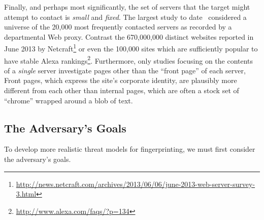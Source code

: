 Finally, and perhaps most significantly, the set of servers that the
target might attempt to contact is \emph{small} and \emph{fixed}.  The
largest study to date~ considered a universe of the
20,000 most frequently contacted servers as recorded by a departmental
Web proxy.  Contrast the 670,000,000 distinct websites reported in
June 2013 by
Netcraft\footnote{\url{http://news.netcraft.com/archives/2013/06/06/june-2013-web-server-survey-3.html}}
or even the 100,000 sites which are sufficiently popular to have
stable Alexa rankings\footnote{\url{http://www.alexa.com/faqs/?p=134}}.
Furthermore, only studies focusing on the contents of a \emph{single}
server investigate pages other than the “front page” of each server,
Front pages, which express the site's corporate identity, are
plausibly more different from each other than internal pages, which
are often a stock set of “chrome” wrapped around a blob of text.

\subsection{The Adversary's Goals}

To develop more realistic threat models for fingerprinting, we must
first consider the adversary's goals.  
